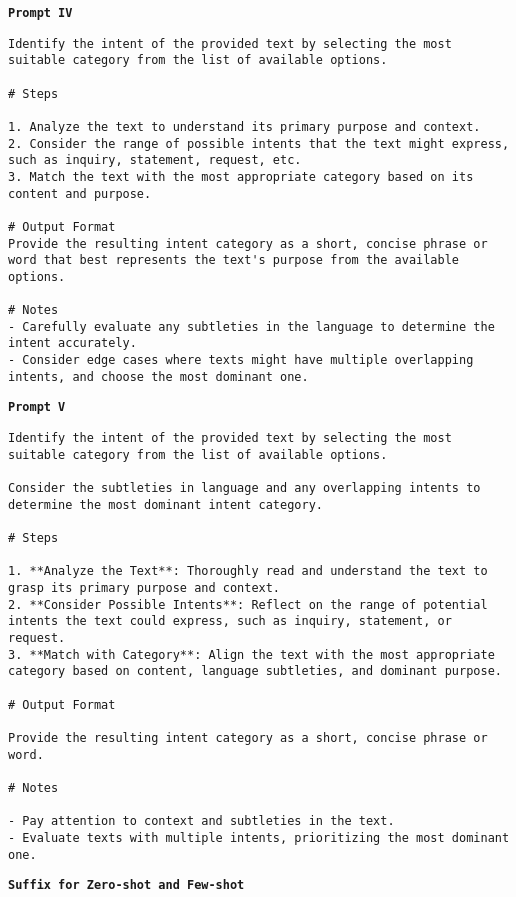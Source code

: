 \texttt{\textbf{Prompt IV}}
\begin{verbatim}
Identify the intent of the provided text by selecting the most suitable category from the list of available options.

# Steps

1. Analyze the text to understand its primary purpose and context.
2. Consider the range of possible intents that the text might express, such as inquiry, statement, request, etc.
3. Match the text with the most appropriate category based on its content and purpose.

# Output Format
Provide the resulting intent category as a short, concise phrase or word that best represents the text's purpose from the available options.

# Notes
- Carefully evaluate any subtleties in the language to determine the intent accurately.
- Consider edge cases where texts might have multiple overlapping intents, and choose the most dominant one.
\end{verbatim}
\texttt{\textbf{Prompt V}}
\begin{verbatim}
Identify the intent of the provided text by selecting the most suitable category from the list of available options.

Consider the subtleties in language and any overlapping intents to determine the most dominant intent category.

# Steps

1. **Analyze the Text**: Thoroughly read and understand the text to grasp its primary purpose and context.
2. **Consider Possible Intents**: Reflect on the range of potential intents the text could express, such as inquiry, statement, or request.
3. **Match with Category**: Align the text with the most appropriate category based on content, language subtleties, and dominant purpose.

# Output Format

Provide the resulting intent category as a short, concise phrase or word.

# Notes

- Pay attention to context and subtleties in the text.
- Evaluate texts with multiple intents, prioritizing the most dominant one.
\end{verbatim}
\texttt{\textbf{Suffix for Zero-shot and Few-shot}}

